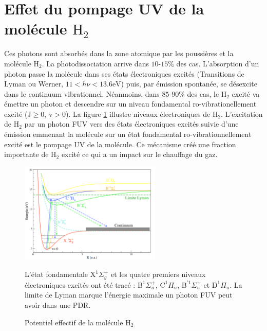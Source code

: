 \section{Effet du pompage UV de la molécule $\mathrm{H}_2$}

Ces photons sont absorbés dans la zone atomique par les poussières et la molécule $\mathrm{H}_2$. La photodissociation arrive dans $10$-$15\%$ des cas. L'absorption d'un photon passe la molécule dans ses états électroniques excités (Transitions de Lyman ou Werner, $ 11<h\nu<13.6\mathrm{eV}$) puis, par émission spontanée, se désexcite dans le continuum vibrationnel. Néanmoins, dans $85$-$90\%$ des cas, le $\mathrm{H}_2$ excité va émettre un photon et descendre sur un niveau fondamental ro-vibrationellement excité ($\mathrm{J}\geq0$, $\mathrm{v}>0$). La figure \ref{fig:H2pump} illustre niveaux électroniques de $\mathrm{H}_2$. L'excitation de $\mathrm{H}_2$ par un photon FUV vers des états électroniques excités suivie d'une émission emmenant la molécule sur un état fondamental ro-vibrationnellement excité est le pompage UV de la molécule. Ce mécanisme créé une fraction importante de $\mathrm{H}_2$ excité ce qui a un impact sur le chauffage du gaz. \newline 


\begin{figure}[!h]
    \centering \includegraphics[trim = {0 0 0 0},clip,width=0.6\textwidth]{figure/H2.pdf}
    \caption{Potentiel effectif de la molécule $\mathrm{H}_2$}
    \begin{minipage}{\textwidth}
    L'état fondamentale $\mathrm{X}^1\Sigma^+_g$ et les quatre premiers niveaux électroniques excités ont été tracé : $\mathrm{B}^1\Sigma_u^+$, $\mathrm{C}^1\Pi_u$, $\mathrm{B}^{'1}\Sigma_u^+$ et $\mathrm{D}^1\Pi_u$. La limite de Lyman marque l'énergie maximale un photon FUV peut avoir dans une PDR.
    \end{minipage}
    \label{fig:H2pump}
\end{figure}

